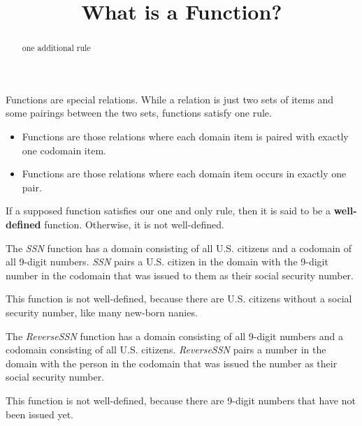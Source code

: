 \documentclass{ximera}
\title{What is a Function?}
\begin{document}
\begin{abstract}
one additional rule
\end{abstract}
\maketitle




Functions are special relations. While a relation is just two sets of items and some pairings between the two sets, functions satisfy one rule. 

\begin{itemize}
\item Functions are those relations where each domain item is paired with exactly one codomain item.
\item Functions are those relations where each domain item occurs in exactly one pair.
\end{itemize}


If a supposed function satisfies our one and only rule, then it is said to be a \textbf{well-defined} function.  Otherwise, it is not well-defined.


\begin{example}
The \textit{SSN} function has a domain consisting of all U.S. citizens and a codomain of all 9-digit numbers.  \textit{SSN} pairs a U.S. citizen in the domain with the 9-digit number in the codomain that was issued to them as their social security number. 

This function is not well-defined, because there are U.S. citizens without a social security number, like many new-born nanies.
\end{example}


\begin{example}
The \textit{ReverseSSN} function has a domain consisting of all 9-digit numbers and a codomain consisting of all U.S. citizens.  \textit{ReverseSSN} pairs a number in the domain with the person in the codomain that was issued the number as their social security number. 

This function is not well-defined, because there are 9-digit numbers that have not been issued yet.
\end{example}
\end{document}
